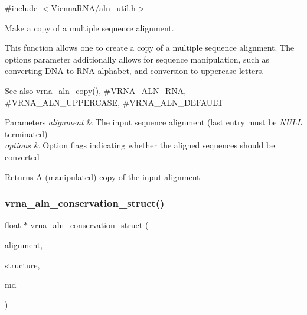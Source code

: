 {\ttfamily \#include $<$\hyperlink{aln__util_8h}{Vienna\+R\+N\+A/aln\+\_\+util.\+h}$>$}



Make a copy of a multiple sequence alignment. 

This function allows one to create a copy of a multiple sequence alignment. The {\ttfamily options} parameter additionally allows for sequence manipulation, such as converting D\+NA to R\+NA alphabet, and conversion to uppercase letters.

\begin{DoxySeeAlso}{See also}
\hyperlink{group__aln__utils_ga08cdca592461436860daf9738279ce17}{vrna\+\_\+aln\+\_\+copy()}, \#\+V\+R\+N\+A\+\_\+\+A\+L\+N\+\_\+\+R\+NA, \#\+V\+R\+N\+A\+\_\+\+A\+L\+N\+\_\+\+U\+P\+P\+E\+R\+C\+A\+SE, \#\+V\+R\+N\+A\+\_\+\+A\+L\+N\+\_\+\+D\+E\+F\+A\+U\+LT
\end{DoxySeeAlso}

\begin{DoxyParams}{Parameters}
{\em alignment} & The input sequence alignment (last entry must be {\itshape N\+U\+LL} terminated) \\
\hline
{\em options} & Option flags indicating whether the aligned sequences should be converted \\
\hline
\end{DoxyParams}
\begin{DoxyReturn}{Returns}
A (manipulated) copy of the input alignment 
\end{DoxyReturn}
\mbox{\label{group__aln__utils_gab6f16a2ea93f3bfd4d089cc8d448bb16}} 
\subsubsection{\texorpdfstring{vrna\+\_\+aln\+\_\+conservation\+\_\+struct()}{vrna\_aln\_conservation\_struct()}}
{\footnotesize\ttfamily float $\ast$ vrna\+\_\+aln\+\_\+conservation\+\_\+struct (\begin{DoxyParamCaption}\item[{const char $\ast$$\ast$}]{alignment,  }\item[{const char $\ast$}]{structure,  }\item[{const \hyperlink{group__model__details_ga1f8a10e12a0a1915f2a4eff0b28ea17c}{vrna\+\_\+md\+\_\+t} $\ast$}]{md }\end{DoxyParamCaption})}



